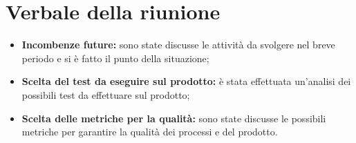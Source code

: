 \section{Verbale della riunione}
	\begin{itemize}
		\item \textbf{Incombenze future:} sono state discusse le attività da svolgere nel breve periodo e si è fatto il punto della situazione;
		\item \textbf{Scelta del test da eseguire sul prodotto:} è stata effettuata un'analisi dei possibili test da effettuare sul prodotto;
		\item \textbf{Scelta delle metriche per la qualità:} sono state discusse le possibili metriche per garantire la qualità dei processi e del prodotto.
	\end{itemize}